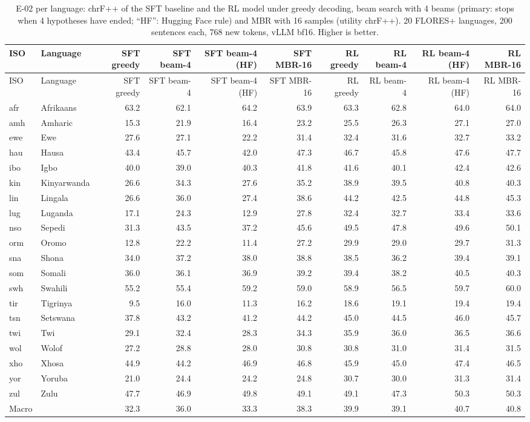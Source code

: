 {\scriptsize\setlength{\tabcolsep}{1.5pt}
\begin{longtable}{@{}llrrrrrrrr@{}}
\caption{E-02 per language: chrF++ of the SFT baseline and the RL model under greedy decoding, beam search with 4 beams (primary: stops when 4 hypotheses have ended; ``HF'': Hugging Face rule) and MBR with 16 samples (utility chrF++). 20 FLORES+ languages, 200 sentences each, 768 new tokens, vLLM bf16. Higher is better.}\label{tab:dec-chrfpp}\\
\toprule
ISO & Language & SFT greedy & SFT beam-4 & SFT beam-4 (HF) & SFT MBR-16 & RL greedy & RL beam-4 & RL beam-4 (HF) & RL MBR-16 \\
\midrule\endfirsthead
\toprule
ISO & Language & SFT greedy & SFT beam-4 & SFT beam-4 (HF) & SFT MBR-16 & RL greedy & RL beam-4 & RL beam-4 (HF) & RL MBR-16 \\
\midrule\endhead
\midrule\endfoot
\bottomrule\endlastfoot
afr & Afrikaans & 63.2 & 62.1 & 64.2 & 63.9 & 63.3 & 62.8 & 64.0 & 64.0 \\
amh & Amharic & 15.3 & 21.9 & 16.4 & 23.2 & 25.5 & 26.3 & 27.1 & 27.0 \\
ewe & Ewe & 27.6 & 27.1 & 22.2 & 31.4 & 32.4 & 31.6 & 32.7 & 33.2 \\
hau & Hausa & 43.4 & 45.7 & 42.0 & 47.3 & 46.7 & 45.8 & 47.6 & 47.7 \\
ibo & Igbo & 40.0 & 39.0 & 40.3 & 41.8 & 41.6 & 40.1 & 42.4 & 42.6 \\
kin & Kinyarwanda & 26.6 & 34.3 & 27.6 & 35.2 & 38.9 & 39.5 & 40.8 & 40.3 \\
lin & Lingala & 26.6 & 36.0 & 27.4 & 38.6 & 44.2 & 42.5 & 44.8 & 45.3 \\
lug & Luganda & 17.1 & 24.3 & 12.9 & 27.8 & 32.4 & 32.7 & 33.4 & 33.6 \\
nso & Sepedi & 31.3 & 43.5 & 37.2 & 45.6 & 49.5 & 47.8 & 49.6 & 50.1 \\
orm & Oromo & 12.8 & 22.2 & 11.4 & 27.2 & 29.9 & 29.0 & 29.7 & 31.3 \\
sna & Shona & 34.0 & 37.2 & 38.0 & 38.8 & 38.5 & 36.2 & 39.4 & 39.1 \\
som & Somali & 36.0 & 36.1 & 36.9 & 39.2 & 39.4 & 38.2 & 40.5 & 40.3 \\
swh & Swahili & 55.2 & 55.4 & 59.2 & 59.0 & 58.9 & 56.5 & 59.7 & 60.0 \\
tir & Tigrinya & 9.5 & 16.0 & 11.3 & 16.2 & 18.6 & 19.1 & 19.4 & 19.4 \\
tsn & Setswana & 37.8 & 43.2 & 41.2 & 44.2 & 45.0 & 44.5 & 46.0 & 45.7 \\
twi & Twi & 29.1 & 32.4 & 28.3 & 34.3 & 35.9 & 36.0 & 36.5 & 36.6 \\
wol & Wolof & 27.2 & 28.8 & 28.0 & 30.8 & 30.8 & 31.0 & 31.4 & 31.5 \\
xho & Xhosa & 44.9 & 44.2 & 46.9 & 46.8 & 45.9 & 45.0 & 47.4 & 46.5 \\
yor & Yoruba & 21.0 & 24.4 & 24.2 & 24.8 & 30.7 & 30.0 & 31.3 & 31.4 \\
zul & Zulu & 47.7 & 46.9 & 49.8 & 49.1 & 49.1 & 47.3 & 50.3 & 50.3 \\
\midrule Macro &  & 32.3 & 36.0 & 33.3 & 38.3 & 39.9 & 39.1 & 40.7 & 40.8 \\
\end{longtable}}
